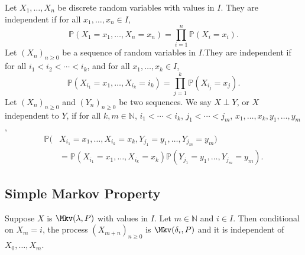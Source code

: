 \documentclass[12pt]{article}
\begin{document}
\begin{definition}
	Let $X_1, \ldots, X_{n}$ be discrete random variables with values in $I$. They are independent if for all $x_1, \ldots, x_n \in I$,
	\[
		\mathbb{P}(X_1 = x_1, \ldots, X_n = x_n) = \prod_{i = 1}^{n} \mathbb{P}(X_i = x_i)
	.\]
	Let $(X_n)_{n \geq 0}$ be a sequence of random variables in $I$.They are independent if for all $i_1 < i_2 < \cdots < i_k$, and for all $x_1, \ldots, x_k \in I$,
	\[
		\mathbb{P}(X_{i_1} = x_1, \ldots, X_{i_k} = i_k) = \prod_{j = 1}^{k} \mathbb{P}(X_{i_j} = x_j)
	.\]
	Let $(X_n)_{n \geq 0}$ and $(Y_n)_{n \geq 0}$ be two sequences. We say $X \perp Y$, or $X$ independent to $Y$, if for all $k, m \in \mathbb{N}$, $i_1 < \cdots < i_k$, $j_1 < \cdots < j_m$, $x_1, \ldots, x_k, y_1, \ldots, y_m$,
	\begin{align*}
		\mathbb{P}(&X_{i_1} = x_1, \ldots, X_{i_k} = x_k, Y_{j_1} = y_1, \ldots, Y_{j_m} = y_m) \\
			   &= \mathbb{P}(X_{i_1} = x_1, \ldots, X_{i_k} = x_k) \mathbb{P}(Y_{j_1} = y_1, \ldots, Y_{j_m} = y_m)
	.\end{align*}
\end{definition}

\subsection{Simple Markov Property}%
\label{sub:simple_markov_property}

\begin{theorem}
	Suppose $X$ is $\Mkv(\lambda, P)$ with values in $I$. Let $m \in \mathbb{N}$ and $i \in I$. Then conditional on $X_m = i$, the process $(X_{m+n})_{n \geq 0}$ is $\Mkv(\delta_i, P)$ and it is independent of $X_0, \ldots, X_m$.
\end{theorem}
\end{document}
